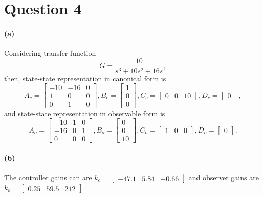 \section{Question 4}
\paragraph{(a)} Considering transfer function
\begin{equation}
G = \frac{10}{s^3 + 10s^2 + 16s},
\end{equation}
\noindent then, state-state representation in canonical form is
\begin{equation*}
A_c =
\begin{bmatrix}
-10 & - 16 	& 0 \\
1   &  	0	& 0 \\
0 	&	1 	& 0 	
\end{bmatrix},
B_c =
\begin{bmatrix}
1 \\ 0 \\ 0
\end{bmatrix},
C_c = 
\begin{bmatrix}
0 	& 	0 	& 	10
\end{bmatrix},
D_c =
\begin{bmatrix}
0
\end{bmatrix},
\end{equation*}
and state-state representation in observable form is
\begin{equation*}
A_o =
\begin{bmatrix}
-10 	&   1 	& 0 \\
-16 	& 	0	& 1 \\
  0 	&	0 	& 0 	
\end{bmatrix},
B_o =
\begin{bmatrix}
0 \\ 0 \\ 10
\end{bmatrix},
C_o = 
\begin{bmatrix}
1 	& 	0 	& 	0
\end{bmatrix},
D_o =
\begin{bmatrix}
0
\end{bmatrix}.
\end{equation*}

\paragraph{(b)} The controller gains can are $k_c=\begin{bmatrix}
-47.1 & 5.84 & -0.66
\end{bmatrix}$ and observer gains are $k_o = \begin{bmatrix}
0.25 & 59.5 & 212
\end{bmatrix}$.


